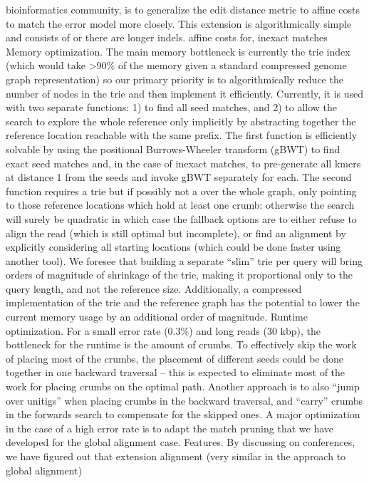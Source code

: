 bioinformatics community, is to generalize the edit distance metric to affine
costs to match the error model more closely. This extension is algorithmically
simple and consists of or there are longer indels. affine costs for, inexact
matches Memory optimization. The main memory bottleneck is currently the trie
index (which would take >90\% of the memory given a standard compressed genome
graph representation) so our primary priority is to algorithmically reduce the
number of nodes in the trie and then implement it efficiently. Currently, it is
used with two separate functions: 1) to find all seed matches, and 2) to allow
the search \A to explore the whole reference only implicitly by abstracting
together the reference location reachable with the same prefix. The first
function is efficiently solvable by using the positional Burrows-Wheeler
transform (gBWT) to find exact seed matches and, in the case of inexact matches,
to pre-generate all kmers at distance 1 from the seeds and invoke gBWT
separately for each. The second function requires a trie but if possibly not a
over the whole graph, only pointing to those reference locations which hold at
least one crumb: otherwise the \A search will surely be quadratic in which case
the fallback options are to either refuse to align the read (which is still
optimal but incomplete), or find an alignment by explicitly considering all
starting locations (which could be done faster using another tool). We foresee
that building a separate “slim” trie per query will bring orders of magnitude of
shrinkage of the trie, making it proportional only to the query length, and not
the reference size. Additionally, a compressed implementation of the trie and
the reference graph has the potential to lower the current memory usage by an
additional order of magnitude. Runtime optimization. For a small error rate
(0.3\%) and long reads (30 kbp), the bottleneck for the runtime is the amount of
crumbs. To effectively skip the work of placing most of the crumbs, the
placement of different seeds could be done together in one backward traversal –
this is expected to eliminate most of the work for placing crumbs on the optimal
path.  Another approach is to also “jump over unitigs” when placing crumbs in
the backward traversal, and “carry” crumbs in the forwards \A search to
compensate for the skipped ones. A major optimization in the case of a high
error rate is to adapt the match pruning that we have developed for the global
alignment case. Features. By discussing \astarix on conferences, we have figured
out that extension alignment (very similar in the approach to global alignment)
